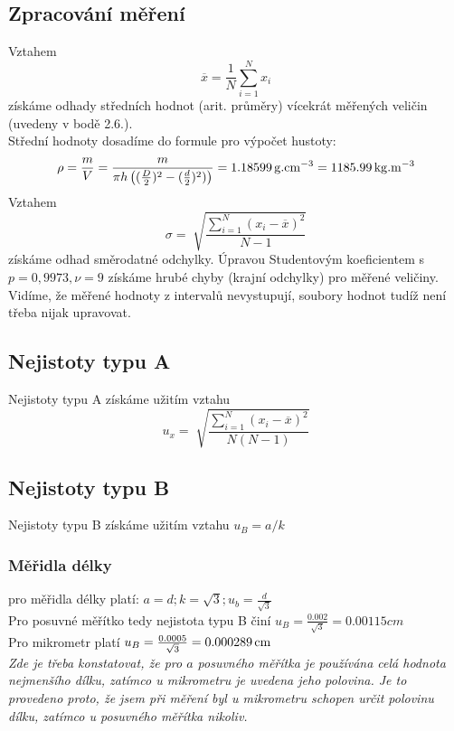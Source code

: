 \documentclass[czech,11pt,a4paper]{article}
\begin{document}
	\subsection{Zpracování měření}
	Vztahem \begin{equation}
		\overline{x} = \frac{1}{N} \sum_{i=1}^{N} x_i
	\end{equation}
	získáme odhady středních hodnot (arit. průměry) vícekrát měřených veličin (uvedeny v bodě 2.6.). \\
	Střední hodnoty dosadíme do formule pro výpočet hustoty:
	\begin{equation}
		 \rho = \frac m V = \frac{ m}{\pi  h \left( (\frac { D} 2)^2 - (\frac {{d}} 2)^2)\right)} = 1.18599 \,\rm g.cm^{-3} = 1 185.99 \,\rm kg.m^{-3}
	\end{equation}
	Vztahem
	\begin{equation}
		\sigma = \sqrt[]{\frac{\sum_{i =1}^N{ (x_i - \overline{x} )^2} }{N-1}}
	\end{equation}
	získáme odhad směrodatné odchylky. Úpravou Studentovým koeficientem s $p = 0,9973, \nu = 9$ získáme hrubé chyby (krajní odchylky) pro měřené veličiny.
    Vidíme, že měřené hodnoty z intervalů nevystupují, soubory hodnot tudíž není třeba nijak upravovat.	
	
	\subsection{Nejistoty typu A}
	Nejistoty typu A získáme užitím vztahu
	\begin{equation}
		u_x = \sqrt[]{\frac{\sum_{i =1}^N{ (x_i - \overline{x} )^2} }{N(N-1)}}
	\end{equation}
	
	\subsection{Nejistoty typu B}
	Nejistoty typu B získáme užitím vztahu $ u_B = a/k $
	
	\subsubsection{Měřidla délky}
	pro měřidla délky platí: $a = d; k = \sqrt{3}; u_b = \frac{d}{\sqrt{3}}$ \\
	Pro posuvné měřítko tedy nejistota typu B činí $u_B = \frac {0.002}{ \sqrt{3}} = 0.00115 cm$ \\
	Pro mikrometr platí $u_B = \frac{0.0005}{\sqrt{3}} = 0.000289 \,\rm cm$ \\
\textit{	Zde je třeba konstatovat, že pro $a$ posuvného měřítka je používána celá hodnota nejmenšího dílku, zatímco u mikrometru je uvedena jeho polovina. Je to provedeno proto, že jsem při měření byl u mikrometru schopen určit polovinu dílku, zatímco u posuvného měřítka nikoliv.}
	
\end{document}
